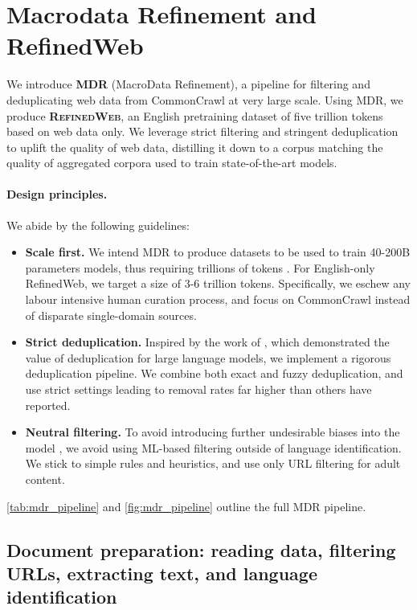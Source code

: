 \section{Macrodata Refinement and RefinedWeb}
\label{sec:mdr}

We introduce \textbf{\textsc{MDR}} (MacroData Refinement), a pipeline for filtering and deduplicating web data from CommonCrawl at very large scale. Using MDR, we produce  \textcolor{refinedweb}{\textbf{\textsc{RefinedWeb}}}, an English pretraining dataset of five trillion tokens based on web data only. We leverage strict filtering and stringent deduplication to uplift the quality of web data, distilling it down to a corpus matching the quality of aggregated corpora used to train state-of-the-art models.

\paragraph{Design principles.} We abide by the following guidelines:

\begin{itemize}
    \item \textbf{Scale first.} We intend MDR to produce datasets to be used to train 40-200B parameters models, thus requiring trillions of tokens \cite{hoffmann2022training}. For English-only RefinedWeb, we target a size of 3-6 trillion tokens. Specifically, we eschew any labour intensive human curation process, and focus on CommonCrawl instead of disparate single-domain sources. 
    \item \textbf{Strict deduplication.} Inspired by the work of \citet{lee2022deduplicating}, which demonstrated the value of deduplication for large language models, we implement a rigorous deduplication pipeline. We combine both exact and fuzzy deduplication, and use strict settings leading to removal rates far higher than others have reported.
    \item \textbf{Neutral filtering.} To avoid introducing further undesirable biases into the model \cite{dodge2021documenting, welbl2021challenges}, we avoid using ML-based filtering outside of language identification. We stick to simple rules and heuristics, and use only URL filtering for adult content. 
\end{itemize}

\ref{tab:mdr_pipeline} and \ref{fig:mdr_pipeline} outline the full MDR pipeline.

\subsection{Document preparation: reading data, filtering URLs, extracting text, and language identification}

